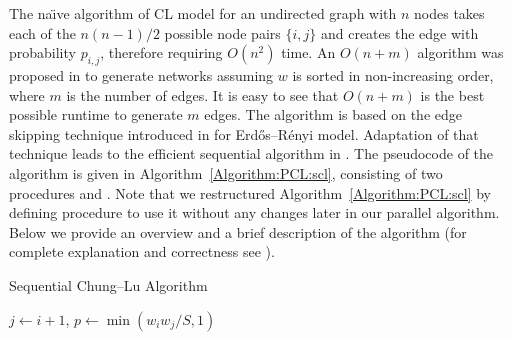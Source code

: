 \documentclass[conference,letterpaper,10pt]{IEEEtran}
\begin{document}
The na\"{\i}ve algorithm of CL model for an undirected graph with $n$ nodes takes each of the $n(n-1)/2$ possible node pairs $\{i,j\}$ and creates the edge with probability $p_{i,j}$, therefore requiring $O(n^2)$ time. An $O(n+m)$ algorithm was proposed in \cite{Miller2011}  to generate networks assuming $w$ is sorted in non-increasing order, where $m$ is the number of edges. It is easy to see that $O(n+m)$ is the best possible runtime to generate $m$ edges. The algorithm is based on the edge skipping technique introduced in \cite{Batagelj2005} for Erd\H{o}s--R\'enyi model. Adaptation of that technique leads to the efficient sequential algorithm in \cite{Miller2011}. The pseudocode of the algorithm is given in Algorithm~\ref{Algorithm:PCL:scl}, consisting of two procedures  and . Note that we restructured Algorithm~\ref{Algorithm:PCL:scl} by defining procedure  to use it without any changes later in our parallel algorithm. Below we provide an overview and a brief description of the algorithm (for complete explanation and correctness see \cite{Miller2011}). 
\begin{algorithm}[t]
\caption{Sequential Chung--Lu Algorithm}
\label{Algorithm:PCL:scl}
\begin{algorithmic}[1]
	\label{Line:PCL:SCL:S}
	\label{Line:PCL:SCL:CreateEdges}
\EndProcedure
{}
	\label{Line:PCL:SCL:foralli}
		\State $j \leftarrow i+1$\label{Line:PCL:SCL:j}, {$p \leftarrow \min(w_iw_j/S, 1)$}
		\label{Line:PCL:SCL:while}
			    \label{Line:PCL:SCL:delta}		
			\Else
		    \EndIf
		    \label{Line:PCL:SCL:v} 
		        \label{Line:PCL:SCL:q}
			        \label{Line:PCL:SCL:E}
	            \EndIf
	            \label{Line:PCL:SCL:jv1}
		    \EndIf
		\EndWhile	
	\EndFor
\EndProcedure
\end{algorithmic}
\end{algorithm}
\end{document}
